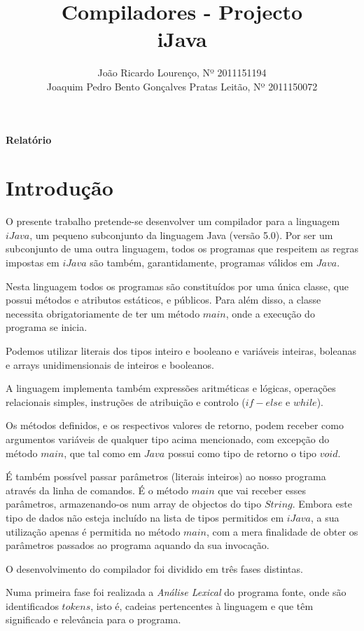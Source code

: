 \documentclass[11pt,a4paper]{article}
\title{\bf{Compiladores - Projecto}\vspace{50mm}\\iJava\vspace{80mm}}
\author{
João Ricardo Lourenço, Nº 2011151194\\
Joaquim Pedro Bento Gonçalves Pratas Leitão, Nº 2011150072}
\begin{document}
\maketitle
\centerline{\textbf{Relatório}}
\pagebreak

\printindex

\renewcommand*\contentsname{Índice}
\tableofcontents

\pagebreak

\section{Introdução}

O presente trabalho pretende-se desenvolver um compilador para a linguagem $iJava$, um pequeno subconjunto da linguagem Java (versão 5.0). Por ser um subconjunto de uma outra linguagem, todos os programas que respeitem as regras impostas em $iJava$ são também, garantidamente, programas válidos em $Java$.

Nesta linguagem todos os programas são constituídos por uma única classe, que possui métodos e atributos estáticos, e públicos. Para além disso, a classe necessita obrigatoriamente de ter um método $main$, onde a execução do programa se inicia. 

Podemos utilizar literais dos tipos inteiro e booleano e variáveis inteiras, boleanas e arrays unidimensionais de inteiros e booleanos.

A linguagem implementa também expressões aritméticas e lógicas, operações relacionais simples, instruções de atribuição e controlo ($if-else$ e $while$).

Os métodos definidos, e os respectivos valores de retorno, podem receber como argumentos variáveis de qualquer tipo acima mencionado, com excepção do método $main$, que tal como em $Java$ possui como tipo de retorno o tipo $void$.

É também possível passar parâmetros (literais inteiros) ao nosso programa através da linha de comandos. É o método $main$ que vai receber esses parâmetros, armazenando-os num array de objectos do tipo $String$. Embora este tipo de dados não esteja incluído na lista de tipos permitidos em $iJava$, a sua utilização apenas é permitida no método $main$, com a mera finalidade de obter os parâmetros passados ao programa aquando da sua invocação.

O desenvolvimento do compilador foi dividido em três fases distintas.

Numa primeira fase foi realizada a \emph{Análise Lexical} do programa fonte, onde são identificados $tokens$, isto é, cadeias pertencentes à linguagem e que têm significado e relevância para o programa.
\end{document}
